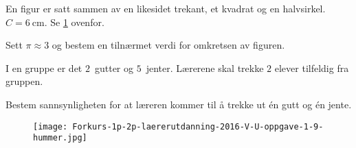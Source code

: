 \begin{figure}[H]
  \centering
  \caption{}
  \label{fig:Forkurs-1p-2p-laererutdanning-2016-V-U-oppgave-1-7}
\end{figure}

En figur er satt sammen av en likesidet trekant, et kvadrat og en halvsirkel.
$C=\SI{6}{\centi\metre}$. Se
\cref{fig:Forkurs-1p-2p-laererutdanning-2016-V-U-oppgave-1-7} ovenfor.
\bigskip

Sett $\pi \approx 3$ og bestem en tilnærmet verdi for omkretsen av figuren.


\Oppgave[2] 

I en gruppe er det $2$~gutter og  $5$~jenter. Lærerene skal trekke $2$ elever
tilfeldig fra gruppen. \bigskip

Bestem sannsynligheten for at læreren kommer til å trekke ut én gutt og én
jente.


\Oppgave[4]

\begin{figure}[H]
  \centering
  \texttt{[image: Forkurs-1p-2p-laererutdanning-2016-V-U-oppgave-1-9-hummer.jpg]}
\end{figure}

